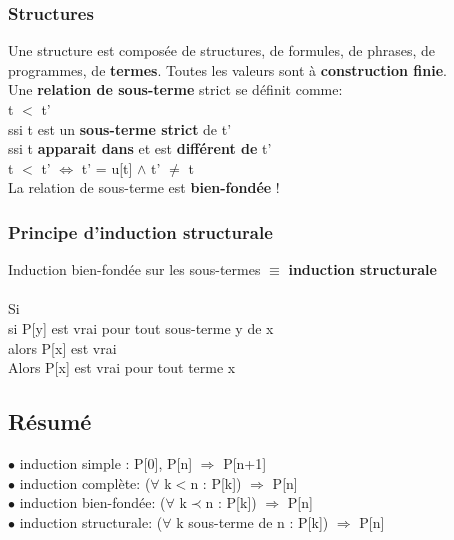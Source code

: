 \subsubsection{Structures}
Une structure est composée de  structures, de formules, de phrases, de programmes, de \textbf{termes}. Toutes les valeurs sont à \textbf{construction finie}.\\

Une \textbf{relation de sous-terme} strict se définit comme:\\
t $<$ t'\\
ssi t est un \textbf{sous-terme strict} de t'\\
ssi t \textbf{apparait dans} et est \textbf{différent de} t'\\
t $<$ t' $\Leftrightarrow$ t' = u[t] $\wedge$ t' $\neq$ t\\
La relation de sous-terme est \textbf{bien-fondée} !
\subsubsection{Principe d'induction structurale}
Induction bien-fondée sur les sous-termes $\equiv$ \textbf{induction structurale}\\ \vspace{0.5mm}\\
Si\\ si P[y] est vrai pour tout sous-terme y de x\\ alors P[x] est vrai\\ Alors P[x] est vrai pour tout terme x

\subsection{Résumé}
$\bullet$ induction simple : P[0], P[n] $\Rightarrow$ P[n+1] \\

$\bullet$ induction complète: ($\forall$ k$<$n : P[k]) $\Rightarrow$ P[n]\\

$\bullet$ induction bien-fondée: ($\forall$ k$\prec$n : P[k]) $\Rightarrow$ P[n]\\

$\bullet$ induction structurale: ($\forall$ k sous-terme de n : P[k]) $\Rightarrow$ P[n]\\
